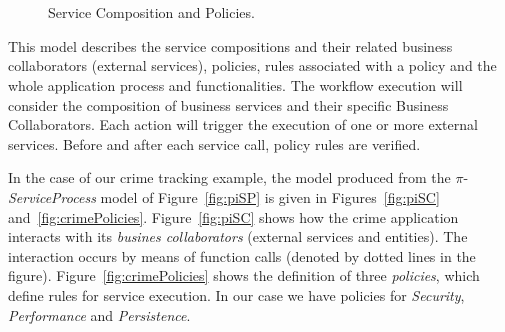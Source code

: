 \begin{figure}[t]
\centering
{}
~ %
\\
~ %
\caption{Service Composition and Policies.}
\label{fig:policies}
\end{figure}
This model describes the service compositions and their related business
collaborators (external services), policies, rules associated with a policy and
the whole application process and functionalities.
The workflow execution will consider the composition of business services and
their specific Business Collaborators. 
Each action will trigger the execution of one or more external services. 
Before and after each service call, policy rules are verified.

In the case of our crime tracking example, the model produced from the $\pi$-\textit{ServiceProcess} model of Figure~\ref{fig:piSP} is given in Figures~\ref{fig:piSC} and~\ref{fig:crimePolicies}.
Figure~\ref{fig:piSC} shows how the crime application interacts with its \textit{busines collaborators} (external services and entities).
The interaction occurs by means of function calls (denoted by dotted lines in the figure).
Figure~\ref{fig:crimePolicies} shows the definition of three \textit{policies}, which define rules for service execution.
In our case we have policies for \textit{Security}, \textit{Performance} and \textit{Persistence}. 


